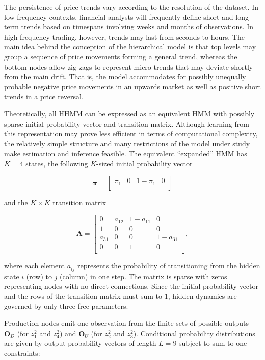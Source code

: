 \documentclass[]{article}
\newcommand{\mat}[1]{\bm{#1}}
\begin{document}
The persistence of price trends vary according to the resolution of the
dataset. In low frequency contexts, financial analysts will frequently
define short and long term trends based on timespans involving weeks and
months of observations. In high frequency trading, however, trends may
last from seconds to hours. The main idea behind the conception of the
hierarchical model is that top levels may group a sequence of price
movements forming a general trend, whereas the bottom nodes allow
zig-zags to represent micro trends that may deviate shortly from the
main drift. That is, the model accommodates for possibly unequally
probable negative price movements in an upwards market as well as
positive short trends in a price reversal.

Theoretically, all HHMM can be expressed as an equivalent HMM with
possibly sparse initial probability vector and transition matrix.
Although learning from this representation may prove less efficient in
terms of computational complexity, the relatively simple structure and
many restrictions of the model under study make estimation and inference
feasible. The equivalent ``expanded'' HMM has \(K = 4\) states, the
following \(K\)-sized initial probability vector

\[
\mat{\pi} = 
  \begin{bmatrix}
  \pi_1 & 0 & 1 - \pi_1 & 0 \\
  \end{bmatrix}
\]

and the \(K \times K\) transition matrix

\[
\mat{A} =
  \begin{bmatrix}
    0      & a_{12} & 1 - a_{11} & 0          \\
    1      & 0      & 0          & 0          \\
    a_{31} & 0      & 0          & 1 - a_{31} \\
    0      & 0      & 1          & 0          \\
  \end{bmatrix},
\]

where each element \(a_{ij}\) represents the probability of
transitioning from the hidden state \(i\) (row) to \(j\) (column) in one
step. The matrix is sparse with zeros representing nodes with no direct
connections. Since the initial probability vector and the rows of the
transition matrix must sum to \(1\), hidden dynamics are governed by
only three free parameters.

Production nodes emit one observation from the finite sets of possible
outputs \(\mat{O}_D\) (for \(z_1^2\) and \(z_4^2\)) and \(\mat{O}_U\)
(for \(z_2^2\) and \(z_3^2\)). Conditional probability distributions are
given by output probability vectors of length \(L = 9\) subject to
sum-to-one constraints:
\end{document}
